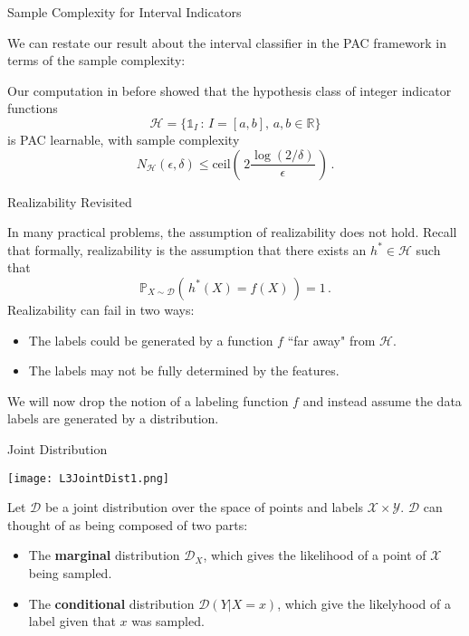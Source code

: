 \documentclass[10pt, table, handout]{beamer}
\newcommand{\cD}{\ensuremath{\mathcal{D}}}
\newcommand{\cX}{\ensuremath{\mathcal{X}}}
\newcommand{\cY}{\ensuremath{\mathcal{Y}}}
\newcommand{\cH}{\ensuremath{\mathcal{H}}}
\newcommand{\bR}{\ensuremath{\mathbb{R}}}
\newcommand{\bP}{\ensuremath{\mathbb{P}}}
\begin{document}
\begin{frame}[fragile]{Sample Complexity for Interval Indicators}

We can restate our result about the interval classifier in the PAC framework in terms of the sample complexity:

Our computation in before showed that the hypothesis class of integer indicator functions 
$$
\mathcal{H} = \{\mathds{1}_{I}\,:\,I = [a,b],\, a,b\in \bR\}
$$ 
is PAC learnable, with sample complexity
$$
N_\cH(\epsilon,\delta) \leq \text{ceil}\left(\,2\frac{\log(2/\delta)}{\epsilon}\,\right)\,.
$$



\end{frame}














\begin{frame}[fragile]{Realizability Revisited}

In many practical problems, the assumption of realizability does not hold. Recall that formally, realizability is the assumption that there exists an $h^*\in \cH$ such that 
$$
\bP_{X\sim \cD}(\,h^*(X) = f(X)\,) = 1\,.
$$
Realizability can fail in two ways:
\begin{itemize}
\item[] The labels could be generated by a function $f$ ``far away" from $\cH$. 
\item[] The labels may not be fully determined by the features. 
\end{itemize}

We will now drop the notion of a labeling function $f$ and instead assume the data labels are generated by a distribution. 

\end{frame}




\begin{frame}[fragile]{Joint Distribution}
  \begin{minipage}[t][0.5\textheight][t]{\textwidth}
    \texttt{[image: L3JointDist1.png]}
        \centering
  \end{minipage}
  \vfill
  \begin{minipage}[t][0.5\textheight][t]{\textwidth}
Let $\cD$ be a joint distribution over the space of points and labels $\cX\times\cY$. $\cD$ can thought of as being composed of two parts: \pause
\begin{itemize}
\item[] The \textbf{marginal} distribution $\cD_X$, which gives the likelihood of a point of $\cX$ being sampled.\pause
\item[] The \textbf{conditional} distribution $\cD(Y|X = x)$, which give the likelyhood of a label given that $x$ was sampled. 
\end{itemize}
  \end{minipage}
\end{frame}
\end{document}
